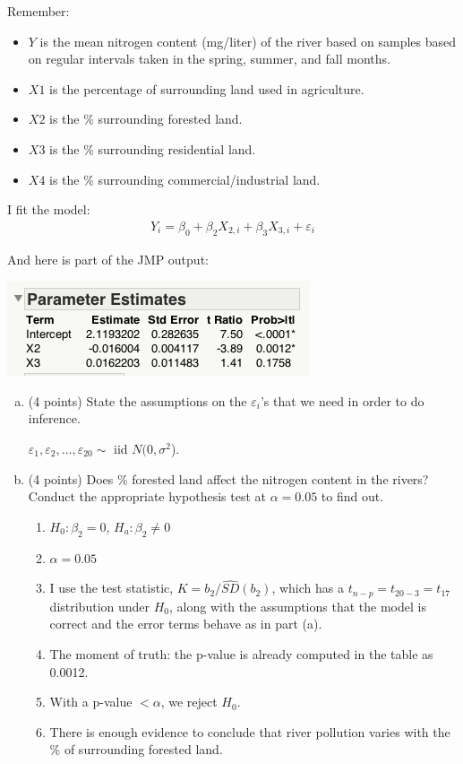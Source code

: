 \documentclass{article}\usepackage{graphicx, color}
\providecommand{\e}{\varepsilon}
\providecommand{\wh}[1]{\widehat{#1}}
\numberwithin{equation}{section}
\begin{document}
\begin{flushleft}
\begin{enumerate}[1. ]
\begin{center}
\end{center}

Remember:
\begin{itemize}
\item $Y$ is the mean nitrogen content (mg/liter) of the river based on samples based on regular intervals taken in the spring, summer, and fall months.
\item $X1$ is the percentage of surrounding land used in agriculture.
\item $X2$ is the \% surrounding forested land.
\item $X3$ is the \% surrounding residential land.
\item $X4$ is the \% surrounding commercial/industrial land.
\end{itemize}

I fit the model:
\begin{align*}
Y_i = \beta_0 + \beta_2 X_{2, i}  + \beta_3 X_{3, i}  + \e_i 
\end{align*}

And here is part of the JMP output:

\begin{center}
 \includegraphics{../../fig/riversparams2.png}
\end{center}

\begin{enumerate}[a. ]
\item (4 points) State the assumptions on the $\e_i$'s that we need in order to do inference.

{\color{red} $\e_1, \e_2, \ldots, \e_{20} \sim $ iid $N(0, \sigma^2$). }


\item (4 points) Does \% forested land affect the nitrogen content in the rivers? Conduct the appropriate hypothesis test at $\alpha = 0.05$ to find out.

{\color{red}

\begin{enumerate}[1. ]
\item $H_0: \beta_2 = 0$, $H_a: \beta_2 \ne 0$
\item $\alpha = 0.05$
\item I use the test statistic, $K = b_2/ \wh{SD}(b_2)$, which has a $t_{n - p} = t_{20 - 3} = t_{17}$ distribution under $H_0$, along with the assumptions that the model is correct and the error terms behave as in part (a). 
\item The moment of truth: the p-value is already computed in the table as 0.0012.
\item With a p-value $< \alpha$, we reject $H_0$.
\item There is enough evidence to conclude that river pollution varies with the \% of surrounding forested land.
\end{enumerate}
}


\end{enumerate}
\end{enumerate}
\end{flushleft}
\end{document}

